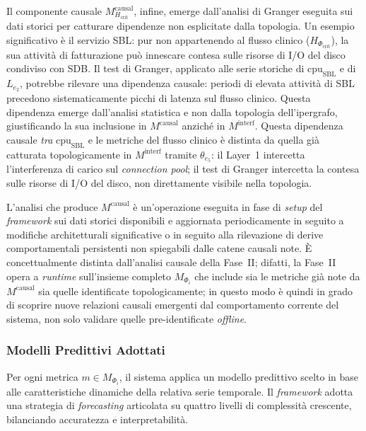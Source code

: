 Il componente causale $M_{H_{\text{crit}}}^{\text{causal}}$, infine, emerge dall'analisi di Granger
eseguita sui dati storici per catturare dipendenze non esplicitate dalla topologia. Un esempio
significativo è il servizio SBL: pur non appartenendo al flusso clinico ($H_{\Phi_{\text{crit}}}$),
la sua attività di fatturazione può innescare contesa sulle risorse di I/O del disco condiviso con
SDB. Il test di Granger, applicato alle serie storiche di $\text{cpu}_{\text{SBL}}$ e di $L_{e_2}$,
potrebbe rilevare una dipendenza causale: periodi di elevata attività di SBL precedono
sistematicamente picchi di latenza sul flusso clinico. Questa dipendenza emerge dall'analisi
statistica e non dalla topologia dell'ipergrafo, giustificando la sua inclusione in
$M^{\text{causal}}$ anziché in $M^{\text{interf}}$. 
Questa dipendenza causale \emph{tra} $\text{cpu}_{\text{SBL}}$ e le metriche
del flusso clinico è distinta da quella già catturata topologicamente in
$M^{\text{interf}}$ tramite $\theta_{e_5}$: il Layer~1 intercetta
l'interferenza di carico sul \textit{connection pool}; il test di Granger
intercetta la contesa sulle risorse di I/O del disco, non direttamente
visibile nella topologia.

L'analisi che produce $M^{\text{causal}}$ è un'operazione eseguita in fase di \textit{setup} del
\textit{framework} sui dati storici disponibili e aggiornata periodicamente in seguito a modifiche
architetturali significative o in seguito alla rilevazione di derive comportamentali persistenti non
spiegabili dalle catene causali note. È concettualmente distinta dall'analisi causale della
Fase~II; difatti, la Fase~II opera a \textit{runtime} sull'insieme completo $M_{\Phi_i}$ che
include sia le metriche già note da $M^{\text{causal}}$ sia quelle identificate topologicamente;
in questo modo è quindi in grado di scoprire nuove relazioni causali emergenti dal comportamento
corrente del sistema, non solo validare quelle pre-identificate \textit{offline}.

\subsubsection{Modelli Predittivi Adottati}
\label{sec:modelli_predittivi}

Per ogni metrica $m \in M_{\Phi_i}$, il sistema applica un modello predittivo scelto in base alle
caratteristiche dinamiche della relativa serie temporale. Il \textit{framework} adotta una strategia
di \textit{forecasting} articolata su quattro livelli di complessità crescente, bilanciando
accuratezza e interpretabilità.

